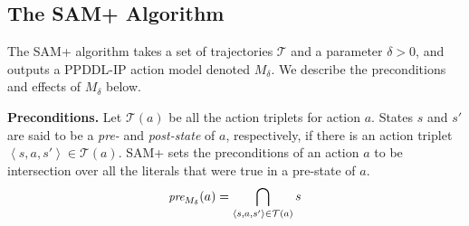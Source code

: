 \documentclass[letterpaper]{article} %
\newcommand{\pre}{\textit{pre}}
\newcommand{\tuple}[1]{\ensuremath{\left \langle #1 \right \rangle }}
\begin{document}


\subsection{The SAM+ Algorithm}


The SAM+ algorithm takes a set of trajectories $\mathcal{T}$ and a parameter $\delta>0$, and outputs a PPDDL-IP action model denoted $M_\delta$. We describe the preconditions and effects of $M_\delta$ below. 

\noindent \textbf{Preconditions.} 
Let $\mathcal{T}(a)$ be all the action triplets for action $a$. 
States $s$ and $s'$ are said to be a \emph{pre-} and \emph{post-state} of $a$, respectively, if there is an action triplet $\tuple{s,a,s'}\in \mathcal{T}(a)$. 
SAM+ sets the preconditions of an action $a$ to be intersection over all the literals that were true in a pre-state of $a$. 
\begin{equation}
\small
        \pre_{M_\delta}(a) =  \bigcap_{\tuple{s, a, s'}\in \mathcal{T}(a)} s \label{eq:pre} 
\end{equation}        
\end{document}
